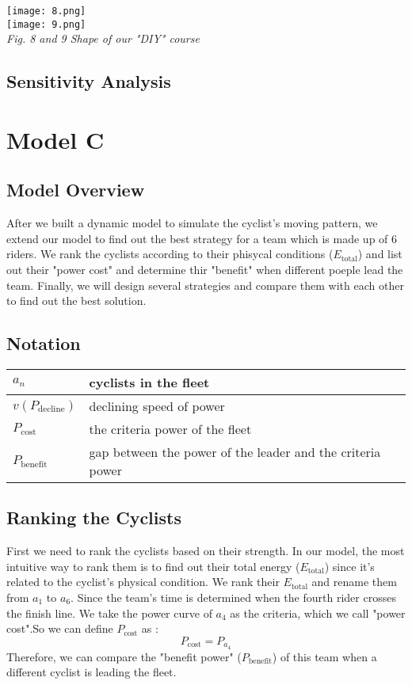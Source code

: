 \documentclass[14pt]{article}
\theoremstyle{definition}
\theoremstyle{remark}
\numberwithin{equation}{section}
\begin{document}
	\begin{center}
		\texttt{[image: 8.png]}\\
		\texttt{[image: 9.png]}\\
		\small \textit{Fig. 8 and 9  Shape of our "DIY" course }
	\end{center}
	\subsection{Sensitivity Analysis}
	\section{Model C}
	\subsection{Model Overview}
	After we built a dynamic model to simulate the cyclist's moving pattern, we extend our model to find out the best strategy for a team which is made up of 6 riders. We rank the cyclists according to their phisycal conditions ($E_\mathrm{total}$) and list out their "power cost" and determine thir "benefit" when different poeple lead the team. Finally, we will design several strategies and compare them with each other to find out the best solution.
	\subsection{Notation}
	\begin{tabular}{|l|l|}
		\hline
		$a_n$&cyclists in the fleet\\
		\hline
		$v(P_\mathrm{decline})$&declining speed of power\\
		\hline
		$P_\mathrm{cost}$&the criteria power of the fleet\\
		\hline
		$P_\mathrm{benefit}$&gap between the power of the leader and the criteria power\\
		\hline
	\end{tabular}
	\subsection{Ranking the Cyclists}
	First we need to rank the cyclists based on their strength. In our model, the most intuitive way to rank them is to find out their total energy ($E_\mathrm{total}$) since it's related to the cyclist's physical condition. We rank their $E_\mathrm{total}$ and rename them from $a_1$ to $a_6$. Since the team's time is determined when the fourth rider crosses the finish line. We take the power curve of $a_4$ as the criteria, which we call "power cost".So we can define $P_\mathrm{cost}$ as :
	$$P_\mathrm{cost}=P_{a_4}$$
	Therefore, we can compare the "benefit power" ($P_\mathrm{benefit}$) of this team when a different cyclist is leading the fleet.
\end{document}
